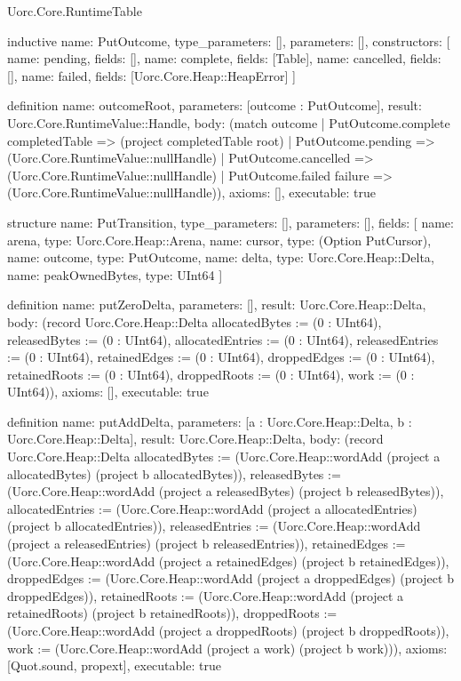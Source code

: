 \begin{lexlean}{Uorc.Core.RuntimeTable}
\begin{semanticmodule}
inductive{
  name: PutOutcome,
  type_parameters: [],
  parameters: [],
  constructors: [
    {name: pending, fields: []},
    {name: complete, fields: [Table]},
    {name: cancelled, fields: []},
    {name: failed, fields: [Uorc.Core.Heap::HeapError]}
  ]
}

definition{
  name: outcomeRoot,
  parameters: [outcome : PutOutcome],
  result: Uorc.Core.RuntimeValue::Handle,
  body: (match outcome
    | PutOutcome.complete completedTable => (project completedTable root)
    | PutOutcome.pending => (Uorc.Core.RuntimeValue::nullHandle)
    | PutOutcome.cancelled => (Uorc.Core.RuntimeValue::nullHandle)
    | PutOutcome.failed failure => (Uorc.Core.RuntimeValue::nullHandle)),
  axioms: [],
  executable: true
}

structure{
  name: PutTransition,
  type_parameters: [],
  parameters: [],
  fields: [
    {name: arena, type: Uorc.Core.Heap::Arena},
    {name: cursor, type: (Option PutCursor)},
    {name: outcome, type: PutOutcome},
    {name: delta, type: Uorc.Core.Heap::Delta},
    {name: peakOwnedBytes, type: UInt64}
  ]
}

definition{
  name: putZeroDelta,
  parameters: [],
  result: Uorc.Core.Heap::Delta,
  body: (record Uorc.Core.Heap::Delta {allocatedBytes := (0 : UInt64), releasedBytes := (0 : UInt64), allocatedEntries := (0 : UInt64), releasedEntries := (0 : UInt64), retainedEdges := (0 : UInt64), droppedEdges := (0 : UInt64), retainedRoots := (0 : UInt64), droppedRoots := (0 : UInt64), work := (0 : UInt64)}),
  axioms: [],
  executable: true
}

definition{
  name: putAddDelta,
  parameters: [a : Uorc.Core.Heap::Delta, b : Uorc.Core.Heap::Delta],
  result: Uorc.Core.Heap::Delta,
  body: (record Uorc.Core.Heap::Delta {allocatedBytes := (Uorc.Core.Heap::wordAdd (project a allocatedBytes) (project b allocatedBytes)), releasedBytes := (Uorc.Core.Heap::wordAdd (project a releasedBytes) (project b releasedBytes)), allocatedEntries := (Uorc.Core.Heap::wordAdd (project a allocatedEntries) (project b allocatedEntries)), releasedEntries := (Uorc.Core.Heap::wordAdd (project a releasedEntries) (project b releasedEntries)), retainedEdges := (Uorc.Core.Heap::wordAdd (project a retainedEdges) (project b retainedEdges)), droppedEdges := (Uorc.Core.Heap::wordAdd (project a droppedEdges) (project b droppedEdges)), retainedRoots := (Uorc.Core.Heap::wordAdd (project a retainedRoots) (project b retainedRoots)), droppedRoots := (Uorc.Core.Heap::wordAdd (project a droppedRoots) (project b droppedRoots)), work := (Uorc.Core.Heap::wordAdd (project a work) (project b work))}),
  axioms: [Quot.sound, propext],
  executable: true
}


\end{semanticmodule}
\end{lexlean}
